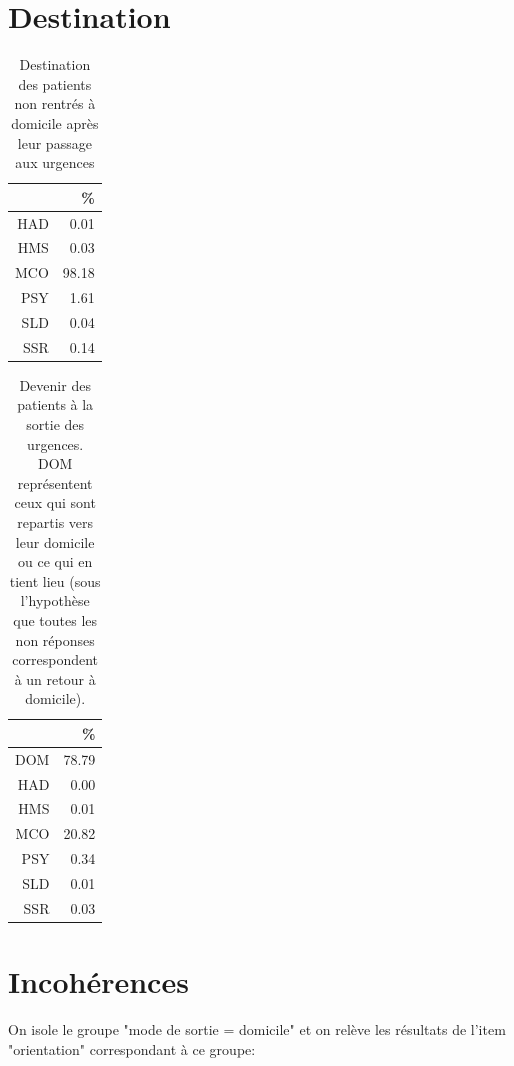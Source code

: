 \documentclass[12pt,english,french,twoside]{book}\usepackage[]{graphicx}\usepackage[]{color}
\begin{document}
\section{Destination}
\begin{table}[ht]
\centering
\begin{tabular}{rr}
  \hline
 & \% \\ 
  \hline
HAD & 0.01 \\ 
  HMS & 0.03 \\ 
  MCO & 98.18 \\ 
  PSY & 1.61 \\ 
  SLD & 0.04 \\ 
  SSR & 0.14 \\ 
   \hline
\end{tabular}
\caption{Destination des patients non rentrés à domicile après leur passage aux urgences} 
\label{tab.dest.hosp}
\end{table}
\begin{table}[ht]
\centering
\begin{tabular}{rr}
  \hline
 & \% \\ 
  \hline
DOM & 78.79 \\ 
  HAD & 0.00 \\ 
  HMS & 0.01 \\ 
  MCO & 20.82 \\ 
  PSY & 0.34 \\ 
  SLD & 0.01 \\ 
  SSR & 0.03 \\ 
   \hline
\end{tabular}
\caption{Devenir des patients à la sortie des urgences. DOM représentent ceux qui sont repartis vers leur domicile ou ce qui en tient lieu (sous l'hypothèse que toutes les non réponses correspondent à un retour à domicile).} 
\label{tab.dest}
\end{table}



\section{Incohérences}


On isole le groupe "mode de sortie = domicile" et on relève les résultats de l'item "orientation" correspondant à ce groupe:
\end{document}
